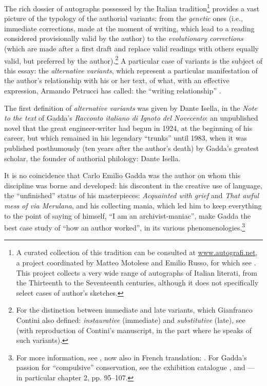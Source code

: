 \documentclass{article}
\begin{document}
The rich dossier of autographs possessed by the Italian
tradition\footnote{A curated collection of this tradition can be consulted at \url{www.autografi.net}, a project
  coordinated by Matteo Motolese and Emilio Russo, for which see \cite{motolese_autografi_2014}. This project collects a
  very wide range of autographs of Italian literati, from the Thirteenth to the Seventeenth centuries,
  although it does not specifically select cases of author's sketches.}
provides a vast picture of the typology of the authorial variants: from
the \emph{genetic} ones (i.e., immediate corrections, made at the moment
of writing, which lead to a reading considered provisionally valid by
the author) to the \emph{evolutionary corrections} (which are made after
a first draft and replace valid readings with others equally valid, but
preferred by the author).\footnote{For the distinction between immediate
  and late variants, which Gianfranco Contini also defined:
  \emph{instaurative} (immediate) and \emph{substitutive} (late), see \cite{italia_alle_nodate} (with reproduction of Contini's manuscript, in the part
  where he speaks of such variants).} A particular case of variants is
the subject of this essay: the \emph{alternative} \emph{variants}, which
represent a particular manifestation of the author's relationship with
his or her text, of what, with an effective expression, Armando Petrucci
has called: the ``writing relationship'' \parencite[63--64]{petrucci_letteratura_2017}.

The first definition of \emph{alternative variants} was given by
Dante Isella, in the \emph{Note to the text} of Gadda's \emph{Racconto
italiano di Ignoto del Novecento}: an unpublished novel that the great
engineer-writer had begun in 1924, at the beginning of his career, but
which remained in his legendary ``trunks'' until 1983, when it was
published posthumously (ten years after the author's death) by Gadda's
greatest scholar, the founder of authorial philology: Dante Isella.

It is no coincidence that Carlo Emilio Gadda was the author on whom this
discipline was borne and developed: his discontent in the creative use
of language, the ``unfinished'' status of his masterpieces:
\emph{Acquainted with grief} and \emph{That awful mess of via Merulana},
and his collecting mania, which led him to keep everything to the point
of saying of himself, ``I am an archivist-maniac'', make Gadda the best
case study of ``how an author worked'', in its various
phenomenologies.\footnote{For more information, see \cite{italia_come_2017}, now also in French translation: \cite{italia_dans_2022}. For Gadda's passion for ``compulsive'' conservation, see the
  exhibition catalogue \parencite{italia_io_2003}, and \cite{falkoff_possessed_2021} –– in particular
  chapter 2, pp. 95--107.}
\end{document}

